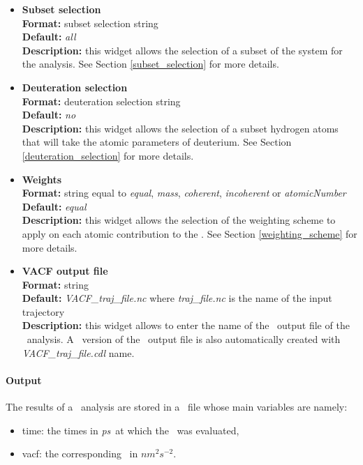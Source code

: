 \documentclass[a4paper,11pt]{report}
\newcommand{\vacfunits}{$nm^2s^{-2}$}
\newcommand{\ps}{\textit{ps}}
\begin{document}
\begin{itemize}
\hypertarget{vacf_subset_selection}{}
\item \textbf{Subset selection}\\
\textbf{Format:} subset selection string\\
\textbf{Default:} \textit{all}\\
\textbf{Description:} this widget allows the selection of a subset of the system for the analysis. 
See Section \ref{subset_selection} for more details.

\hypertarget{vacf_deuteration_selection}{}
\item \textbf{Deuteration selection}\\
\textbf{Format:} deuteration selection string\\
\textbf{Default:} \textit{no}\\
\textbf{Description:} this widget allows the selection of a subset hydrogen atoms that will take the atomic parameters 
of deuterium. See Section \ref{deuteration_selection} for more details.

\hypertarget{vacf_weights}{}
\item \textbf{Weights}\\
\textbf{Format:} string equal to \textit{equal}, \textit{mass}, \textit{coherent}, \textit{incoherent} or \textit{atomicNumber}\\
\textbf{Default:} \textit{equal}\\
\textbf{Description:} this widget allows the selection of the weighting scheme to apply on each atomic contribution 
to the \VACF. See Section \ref{weighting_scheme} for more details. 

\hypertarget{vacf_vacf_output_file}{}
\item \textbf{VACF output file}\\
\textbf{Format:} string\\
\textbf{Default:} \textit{VACF\_traj\_file.nc} where \textit{traj\_file.nc} is the name of the input trajectory\\
\textbf{Description:} this widget allows to enter the name of the \NetCDF\ output file of the \VACF\ analysis. A \CDL\ 
version of the \NetCDF\ output file is also automatically created with \textit{VACF\_traj\_file.cdl} name.
\end{itemize}

\paragraph{Output\\}
The results of a \VACF\ analysis are stored in a \NetCDF\ file whose main variables are namely:
\begin{itemize}
\item time: the times in \ps\ at which the \VACF\ was evaluated,
\item vacf: the corresponding \VACF\ in \vacfunits .
\end{itemize}
\end{document}
